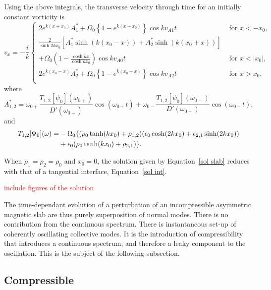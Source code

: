 \documentclass[12pt]{../style-files/ociamthesis}
\begin{document}
Using the above integrals, the transverse velocity through time for an initially constant vorticity is
\begin{equation}
v_x = -\frac{i}{k}\begin{cases}
2 e^{k(x+x_0)} A^*_1 + \Omega_0 \left\{1 - e^{k(x+x_0)}\right\} \cos{kv_{A1}t} \quad &\text{ for } x<-x_0, \\
\frac{2}{\sinh{2kx_0}} \left[ A^*_1 \sinh(k(x_0 - x)) + A^*_2 \sinh(k(x_0 + x)) \right] & \\
+ \Omega_0 \left( 1 - \frac{\cosh{kx}}{\cosh{kx_0}} \right)\cos{kv_{A0}t} \quad &\text{ for } x < |x_0|, \\
2 e^{k(x_0-x)} A^*_2 + \Omega_0 \left\{1 - e^{k(x_0-x)}\right\} \cos{kv_{A2}t} \quad &\text{ for } x>x_0, \\
\end{cases}
\label{sol slab}
\end{equation}
where
\begin{equation}
A^*_{1,2} = \omega_{0+} \frac{T_{1,2}[\psi_0](\omega_{0+})}{D'(\omega_{0+})} \cos(\omega_{0+} t) + \omega_{0-}\frac{T_{1,2}[\psi_0](\omega_{0-})}{D'(\omega_{0-})} \cos(\omega_{0-} t),
\end{equation}
and
\begin{align}
T_{1,2}[\Psi_0](\omega) = &-\Omega_0\{ (\rho_0 \tanh(kx_0) + \rho_{1,2}) (\epsilon_0 \cosh(2kx_0) + \epsilon_{2,1}\sinh(2kx_0)) \notag \\
&+ \epsilon_0(\rho_0 \tanh(kx_0) + \rho_{2,1}) \}.
\end{align}

When $\rho_1 = \rho_2 = \rho_0$ and $x_0 = 0$, the solution given by Equation~\eqref{sol slab} reduces with that of a tangential interface, Equation~\eqref{sol int}.

\textcolor{red}{include figures of the solution}

The time-dependant evolution of a perturbation of an incompressible asymmetric magnetic slab are thus purely superposition of normal modes. There is no contribution from the continuous spectrum. There is instantaneous set-up of coherently oscillating collective modes. It is the introduction of compressibility that introduces a continuous spectrum, and therefore a leaky component to the oscillation. This is the subject of the following subsection.


\subsection{Compressible}
\end{document}
